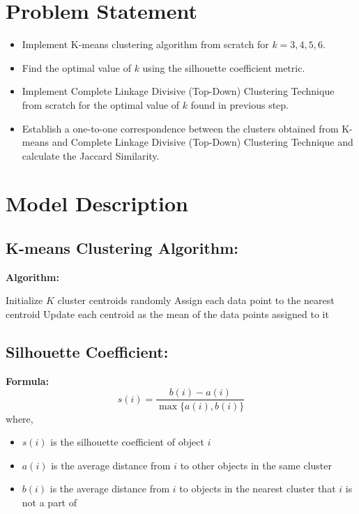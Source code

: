 \documentclass[12pt]{article}
\begin{document}
	\section{Problem Statement}
	\begin{itemize}
		\item Implement K-means clustering algorithm from scratch for $k=3, 4, 5, 6$.
		\item Find the optimal value of $k$ using the silhouette coefficient metric.
		\item Implement Complete Linkage Divisive (Top-Down) Clustering Technique from scratch for the optimal value of $k$ found in previous step.
		\item Establish a one-to-one correspondence between the clusters obtained from K-means and Complete Linkage Divisive (Top-Down) Clustering Technique and calculate the Jaccard Similarity.
	\end{itemize}

	\section{Model Description}

	\subsection{K-means Clustering Algorithm:}
	\textbf{Algorithm:} \\
	\begin{algorithmic}
	\State Initialize $K$ cluster centroids randomly
	\Repeat
		\State Assign each data point to the nearest centroid
		\State Update each centroid as the mean of the data points assigned to it
	\end{algorithmic}
	
	\subsection{Silhouette Coefficient:}
	\textbf{Formula:}
	\[
	s(i) = \frac{b(i) - a(i)}{\max\{a(i), b(i)\}}
	\]
	where,
	\begin{itemize}
		\item $s(i)$ is the silhouette coefficient of object $i$
		\item $a(i)$ is the average distance from $i$ to other objects in the same cluster
		\item $b(i)$ is the average distance from $i$ to objects in the nearest cluster that $i$ is not a part of
	\end{itemize}
	
\end{document}

